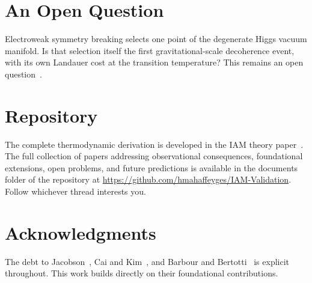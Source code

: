 \documentclass[12pt,a4paper]{article}
\begin{document}
\section{An Open Question}
\label{sec:openquestion}

Electroweak symmetry breaking selects one point of the degenerate Higgs vacuum
manifold. Is that selection itself the first gravitational-scale decoherence event,
with its own Landauer cost at the transition temperature? This remains an open question~\citep{mahaffey2026higgs}.


\section{Repository}
\label{sec:repository}

The complete thermodynamic derivation is developed in the IAM theory
paper~\citep{mahaffey2026}. The full collection of papers addressing
observational consequences, foundational extensions, open problems, and
future predictions is available in the documents folder of the repository
at \url{https://github.com/hmahaffeyges/IAM-Validation}. Follow whichever
thread interests you.

\section*{Acknowledgments}

The debt to Jacobson~\citeyearpar{Jacobson1995},
Cai and Kim~\citeyearpar{CaiKim2005}, and
Barbour and Bertotti~\citeyearpar{BarbourBertotti1982} is explicit
throughout. This work builds directly on their foundational contributions.
\end{document}
